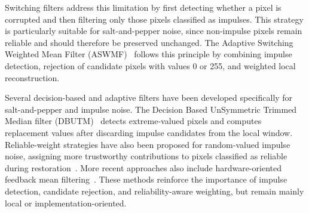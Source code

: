 \documentclass[pdflatex,iicol,sn-mathphys-num]{sn-jnl}
\newcommand{\aswmf}{ASWMF\xspace}
\newif\ifshowportuguese
\newcommand{\pt}[1]{\ifshowportuguese\par\begingroup\small\color{blue!55!black}\noindent\textbf{PT: }#1\par\endgroup\fi}
\begin{document}
Switching filters address this limitation by first detecting whether a pixel is corrupted and then filtering only those pixels classified as impulses. This strategy is particularly suitable for salt-and-pepper noise, since non-impulse pixels remain reliable and should therefore be preserved unchanged. The Adaptive Switching Weighted Mean Filter (\aswmf)~\cite{thanh2020adaptive} follows this principle by combining impulse detection, rejection of candidate pixels with values 0 or 255, and weighted local reconstruction.
\pt{Filtros com chaveamento tratam essa limitação detectando primeiro se um pixel está corrompido e filtrando apenas os pixels classificados como impulsos. Essa estratégia é particularmente adequada para ruído sal-e-pimenta, pois pixels não impulsivos permanecem confiáveis e, portanto, devem ser preservados inalterados. O Adaptive Switching Weighted Mean Filter (\aswmf)~\cite{thanh2020adaptive} segue esse princípio ao combinar detecção de impulsos, rejeição de candidatos com valores 0 ou 255 e reconstrução local ponderada.}

Several decision-based and adaptive filters have been developed specifically for salt-and-pepper and impulse noise. The Decision Based UnSymmetric Trimmed Median filter (DBUTM)~\cite{shekar2011removal} detects extreme-valued pixels and computes replacement values after discarding impulse candidates from the local window. Reliable-weight strategies have also been proposed for random-valued impulse noise, assigning more trustworthy contributions to pixels classified as reliable during restoration~\cite{jin2020removing}. More recent approaches also include hardware-oriented feedback mean filtering~\cite{siva2024hsmf}. These methods reinforce the importance of impulse detection, candidate rejection, and reliability-aware weighting, but remain mainly local or implementation-oriented.
\pt{Diversos filtros baseados em decisão e adaptativos foram desenvolvidos especificamente para ruído sal-e-pimenta e ruído impulsivo. O Decision Based UnSymmetric Trimmed Median filter (DBUTM)~\cite{shekar2011removal} detecta pixels com valores extremos e calcula valores de substituição após descartar candidatos impulsivos da janela local. Estratégias baseadas em pesos de confiabilidade também foram propostas para ruído impulsivo de valores aleatórios, atribuindo contribuições mais confiáveis aos pixels classificados como confiáveis durante a restauração~\cite{jin2020removing}. Abordagens mais recentes também incluem filtragem por média com realimentação orientada a hardware~\cite{siva2024hsmf}. Esses métodos reforçam a importância da detecção de impulsos, da rejeição de candidatos e da ponderação orientada à confiabilidade, mas permanecem principalmente locais ou orientados à implementação.}
\end{document}
